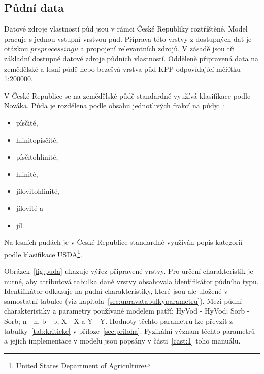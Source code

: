 % 

 
 
 
 
 
 
 
 
 
 
 
 
 
 
 
 
 
 
 
\subsection{Půdní data} \label{sec:vstuppuda}

Datové zdroje vlastností půd jsou v rámci České Republiky roztříštěné. Model \smod pracuje s jednou vstupní vrstvou půd. Příprava této vrstvy z dostupných dat je otázkou $preprocessingu$ a propojení relevantních zdrojů. V zásadě jsou tři základní dostupné datové zdroje půdních vlastností. Odděleně připravená  data na zemědělské a lesní půdě nebo bezešvá vrstva půd KPP odpovídající měřítku 1:200000.

V České Republice se na zemědělské půdě standardně využívá klasifikace podle Nováka. Půda je rozdělena podle obsahu jednotlivých frakcí na půdy: :
\begin{itemize} \itemsep -3pt
  \item písčité,
  \item hlinitopísčité,
  \item písčitohlinité,
  \item hlinité,
  \item jílovitohlinité,
  \item jílovité a
  \item jíl.
\end{itemize}
% 
Na lesních půdách je v České Republice standardně využíván popis kategorií podle klasifikace USDA\footnote{United States Department of Agriculture}.



Obrázek~\ref{fig:puda} ukazuje výřez připravené vrstvy. Pro určení charakteristik je nutné, aby atributová tabulka dané vrstvy obsahovala identifikátor půdního typu. Identifikátor odkazuje na půdní charakteristiky, které jsou ale uložené v samostatní tabulce (viz kapitola~\ref{sec:upravatabulkyparametru}). Mezi půdní charakteristiky a parametry používané modelem patří: \acs{HyVod} - \acl{HyVod}; \acs{Sorb} - \acl{Sorb}; \acs{n} - \acl{n}, \acs{b} - \acl{b}, \acs{X} - \acl{X} a  \acs{Y} - \acl{Y}. Hodnoty těchto parametrů lze převzít z tabulky~\ref{tab:kriticke} v příloze~\ref{sec:priloha}. Fyzikální význam těchto parametrů a jejich implementace v modelu jsou popsány v části~\ref{cast:1} toho manuálu. 





